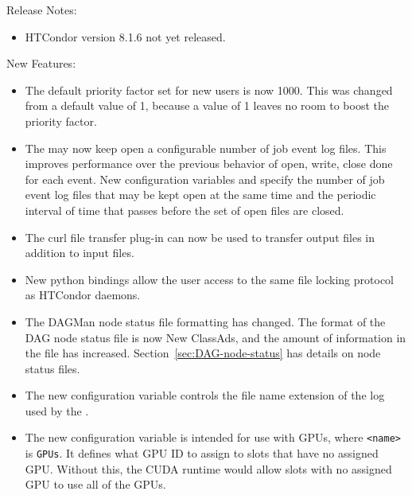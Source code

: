 \noindent Release Notes:

\begin{itemize}

\item HTCondor version 8.1.6 not yet released.

\end{itemize}


\noindent New Features:

\begin{itemize}

\item The default priority factor set for new users is now 1000.
This was changed from a default value of 1, because a value of 1 
leaves no room to boost the priority factor.

\item The  may now keep open a configurable number
of job event log files.
This improves performance over the previous behavior of
open, write, close done for each event.
New configuration variables  and 
 specify the number
of job event log files that may be kept open at the same time
and the periodic interval of time that passes
before the set of open files are closed.

\item The curl file transfer plug-in can now be used to transfer output
files in addition to input files.

\item New python bindings allow the user access to the same 
file locking protocol as HTCondor daemons.

\item The DAGMan node status file formatting has changed.
The format of the DAG node status file is now New ClassAds,
and the amount of information in the file has increased.
Section~\ref{sec:DAG-node-status} has details on node status files.

\item The new configuration variable 
controls the file name extension of the log used by the .

\item The new configuration variable
is intended for use with GPUs, where \texttt{<name>} is \texttt{GPUs}. 
It defines what GPU ID to assign to slots that have no assigned GPU.
Without this, the CUDA runtime would allow slots with no assigned GPU to use
all of the GPUs.


\end{itemize}
